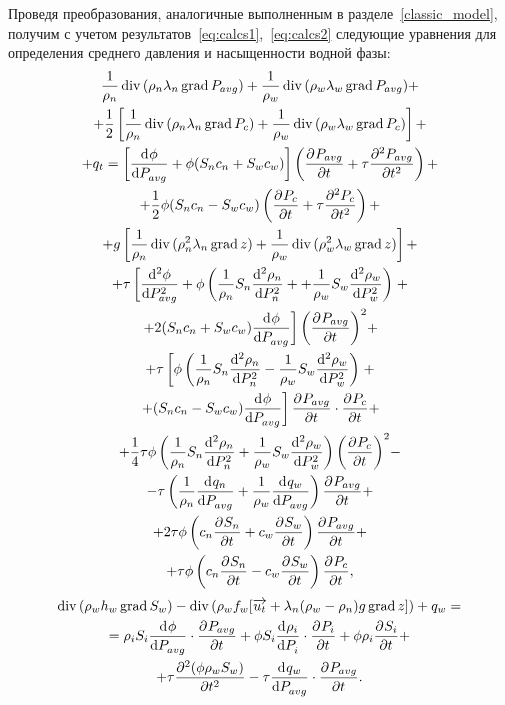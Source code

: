 Проведя преобразования, аналогичные выполненным в разделе~\ref{classic_model},
получим с учетом результатов~\eqref{eq:calcs1},~\eqref{eq:calcs2} следующие уравнения для определения
среднего давления и насыщенности водной фазы:
\begin{equation} \label{eq:full_pressure}
 \begin{gathered}
   \frac{1}{\rho_n} \diver{ (\rho_n\lambda_n\grad{ P_{avg}})} + \frac{1}{\rho_w} \diver{ (\rho_w\lambda_w\grad{ P_{avg}})}  +\\
   + \frac{1}{2} \left[ \frac{1}{\rho_n} \diver{ (\rho_n\lambda_n\grad{ P_c})} + \frac{1}{\rho_w} \diver{ (\rho_w\lambda_w\grad{ P_c})} \right]  +\\
   + q_t = \left[ \dd{\phi}{P_{avg}} + \phi (S_n c_n + S_w c_w) \right] \left( \pd{P_{avg}}{t} + \tau \pd[2]{P_{avg}}{t} \right) +\\
   + \frac{1}{2} \phi (S_n c_n - S_w c_w) \left( \pd{P_{c}}{t} + \tau \pd[2]{P_c}{t} \right) +\\
   + g \left[ \frac{1}{\rho_n} \diver{ (\rho_n^2\lambda_n\grad{ z})} + \frac{1}{\rho_w} \diver{ (\rho_w^2\lambda_w\grad{ z})} \right] +\\
   + \tau \left[ \dd[2]{\phi}{P_{avg}} + \phi \left( \frac{1}{\rho_n} S_n \dd[2]{\rho_n}{P_n} +
   + \frac{1}{\rho_w} S_w \dd[2]{\rho_w}{P_w} \right) \right. + \\
   \left. + 2(S_n c_n + S_w c_w) \dd{\phi}{P_{avg}} \right] {\left( \pd{P_{avg}}{t}\right) }^2 +\\
   + \tau \left[ \phi \left( \frac{1}{\rho_n} S_n \dd[2]{\rho_n}{P_n} - \frac{1}{\rho_w} S_w \dd[2]{\rho_w}{P_w} \right) \right. +\\
   \left. + (S_n c_n - S_w c_w) \dd{\phi}{P_{avg}} \right] \pd{P_{avg}}{t} \cdot \pd{P_c}{t} +\\
   + \frac{1}{4} \tau \phi \left( \frac{1}{\rho_n} S_n \dd[2]{\rho_n}{P_n} + \frac{1}{\rho_w} S_w \dd[2]{\rho_w}{P_w} \right) {\left( \pd{P_c}{t}\right) }^2 -\\
  - \tau \left(\frac{1}{\rho_n}\dd{q_n}{P_{avg}} + \frac{1}{\rho_w}\dd{q_w}{P_{avg}}\right) \pd{P_{avg}}{t} +\\
   + 2 \tau \phi \left(c_n \pd{S_n}{t} + c_w \pd{S_w}{t} \right) \pd{P_{avg}}{t}+ \\
   + \tau \phi \left(c_n \pd{S_n}{t} - c_w \pd{S_w}{t} \right) \pd{P_c}{t},
 \end{gathered}
\end{equation}
\begin{equation} \label{eq:full_saturation}
 \begin{gathered}
  \diver{(\rho_w h_w \grad{ S_w})} - \diver{(\rho_w f_w[\overrightarrow{u_t} + \lambda_n(\rho_w - \rho_n)g \grad{ z}])} + q_w =\\
  = \rho_i S_i \dd{\phi}{P_{avg}} \cdot \pd{P_{avg}}{t} + \phi S_i \dd{\rho_i}{P_i} \cdot \pd{P_i}{t} + \phi \rho_i \pd{S_i}{t} +\\
  + \tau \pd[2]{(\phi \rho_w S_w)}{t} - \tau \dd{q_w}{P_{avg}} \cdot \pd{P_{avg}}{t}.
 \end{gathered}
\end{equation} 

